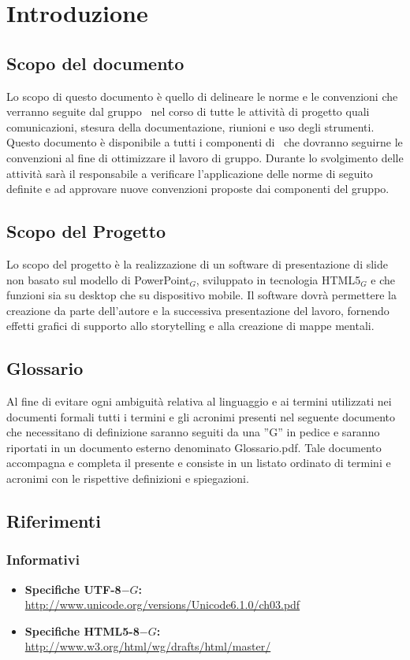 \section{Introduzione}

\subsection{Scopo del documento}
Lo scopo di questo documento è quello di delineare le norme e le convenzioni che verranno seguite dal gruppo \gruppo\ nel corso di tutte le attività di progetto quali comunicazioni, stesura della documentazione, riunioni e uso degli strumenti.
Questo documento è disponibile a tutti i componenti di \gruppo\ che dovranno seguirne le convenzioni al fine di ottimizzare il lavoro di gruppo.
Durante lo svolgimento delle attività sarà il responsabile a verificare l’applicazione delle norme di seguito definite e ad approvare nuove convenzioni proposte dai componenti del gruppo.

\subsection{Scopo del Progetto}
Lo scopo del progetto è la realizzazione di un software di presentazione di slide non basato sul modello di PowerPoint$_{G}$, sviluppato in tecnologia HTML5$_{G}$ e che funzioni sia su desktop che su dispositivo mobile. Il software dovrà permettere la creazione da parte dell'autore e la successiva presentazione del lavoro, fornendo effetti grafici di supporto allo storytelling e alla creazione di mappe mentali. 

\subsection{Glossario}
Al fine di evitare ogni ambiguità relativa al linguaggio e ai termini utilizzati nei documenti formali tutti i termini e gli acronimi presenti nel seguente documento che necessitano di definizione saranno seguiti da una ”G” in pedice e saranno riportati in un documento esterno denominato Glossario.pdf. Tale documento accompagna e completa il presente e consiste in un listato ordinato di termini e acronimi con le rispettive definizioni e spiegazioni.

\subsection{Riferimenti}
\subsubsection{Informativi}
\begin{itemize}
	\item \textbf{Specifiche UTF-8$-G$:} \href{http://www.unicode.org/versions/Unicode6.1.0/ch03.pdf}{http://www.unicode.org/versions/Unicode6.1.0/ch03.pdf}
	\item \textbf{Specifiche HTML5-8$-G$:} \href{http://www.w3.org/html/wg/drafts/html/master/}{http://www.w3.org/html/wg/drafts/html/master/}
\end{itemize}
